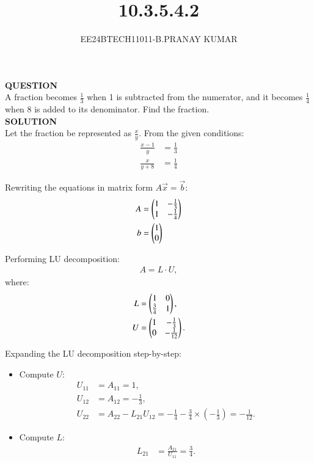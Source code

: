 \documentclass[journal]{IEEEtran}
\begin{document}

\vspace{3cm}

\title{10.3.5.4.2}
\author{EE24BTECH11011-B.PRANAY KUMAR}
{\let\newpage\relax\maketitle}

\renewcommand{\thefigure}{\theenumi}
\renewcommand{\thetable}{\theenumi}
\setlength{\intextsep}{10pt} 

\renewcommand{\thetable}{\theenumi}

\textbf{QUESTION} \\
A fraction becomes $\frac{1}{3}$ when 1 is subtracted from the numerator, and it becomes $\frac{1}{4}$ when 8 is added to its denominator. Find the fraction.\\

\textbf{SOLUTION} \\
Let the fraction be represented as $\frac{x}{y}$. From the given conditions:
\begin{align}
    \frac{x - 1}{y} &= \frac{1}{3} \\
    \frac{x}{y + 8} &= \frac{1}{4}
\end{align}

Rewriting the equations in matrix form $A\vec{x} = \vec{b}$:
\begin{align}
A &= \begin{pmatrix} 1 & -\frac{1}{3} \\ 1 & -\frac{1}{4} \end{pmatrix}\\
b &=  \begin{pmatrix} 1 \\ 0\end{pmatrix}
\end{align}

Performing LU decomposition:
\begin{align}
    A = L \cdot U,
\end{align}
where:
\begin{align}
    L &= \begin{pmatrix}1 & 0 \\ \frac{3}{4} & 1\end{pmatrix}, \\
    U &= \begin{pmatrix}1 & -\frac{1}{3} \\ 0 & -\frac{1}{12}\end{pmatrix}.
\end{align}

Expanding the LU decomposition step-by-step:
\begin{itemize}
    \item Compute $U$:
    \begin{align}
        U_{11} &= A_{11} = 1, \\
        U_{12} &= A_{12} = -\frac{1}{3}, \\
        U_{22} &= A_{22} - L_{21} U_{12} = -\frac{1}{4} - \frac{3}{4} \times (-\frac{1}{3}) = -\frac{1}{12}.
    \end{align}
    \item Compute $L$:
    \begin{align}
        L_{21} &= \frac{A_{21}}{U_{11}} = \frac{3}{4}.
    \end{align}
\end{itemize}
\end{document}
